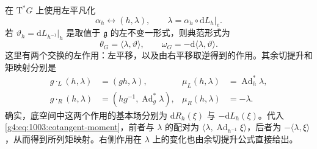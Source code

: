 在 \(\mathrm{T}^*G\) 上使用左平凡化
\[
	\alpha_h\longleftrightarrow(h,\lambda),\qquad
	\lambda=\alpha_h\circ\mathrm{d}L_h|_e.
\]
若 \(\vartheta_h=\mathrm{d}L_{h^{-1}}|_h\) 是取值于 \(\mathfrak g\) 的左不变一形式，则典范形式为
\[
	\theta_G=\langle\lambda,\vartheta\rangle,\qquad
	\omega_G=-\mathrm{d}\langle\lambda,\vartheta\rangle.
\]
这里有两个交换的左作用：左平移，以及由右平移取逆得到的作用。其余切提升和矩映射分别是
\begin{equation}\label{g4:eq:1003:two-cotangent-actions}
	\begin{aligned}
		g\cdot_L(h,\lambda)&=(gh,\lambda),
		&\mu_L(h,\lambda)&=\operatorname{Ad}_h^*\lambda,\\
		g\cdot_R(h,\lambda)&=(hg^{-1},\operatorname{Ad}_g^*\lambda),
		&\mu_R(h,\lambda)&=-\lambda.
	\end{aligned}
\end{equation}
确实，底空间中这两个作用的基本场分别为
\(\mathrm{d}R_h(\xi)\) 与 \(-\mathrm{d}L_h(\xi)\)。代入\eqref{g4:eq:1003:cotangent-moment}，前者与 \(\lambda\) 的配对为
\(\langle\lambda,\operatorname{Ad}_{h^{-1}}\xi\rangle\)，后者为
\(-\langle\lambda,\xi\rangle\)，从而得到所列矩映射。右侧作用在 \(\lambda\) 上的变化也由余切提升公式直接给出。


